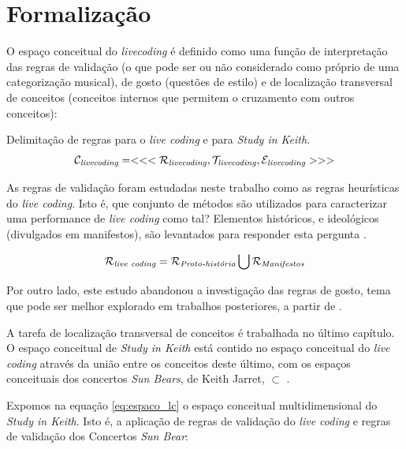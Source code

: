 \section{Formalização}\label{sec:formaliza}

O espaço conceitual do \emph{livecoding} é definido como uma função de interpretação das regras de validação (o que pode ser ou não considerado como próprio de uma categorização musical), de gosto (questões de estilo) e de localização transversal de conceitos (conceitos internos que permitem o cruzamento com outros conceitos):

\begin{example}{Delimitação de regras para o \emph{live coding} e para \emph{Study in Keith}.}
\begin{equation}
\mathcal{C}_\emph{livecoding} = <<<\mathcal{R}_\emph{livecoding}, \mathcal{T}_\emph{livecoding},  \mathcal{E}_\emph{livecoding} >>> 
\end{equation}

As regras de validação foram estudadas neste trabalho como as regras heurísticas do \emph{live coding}. Isto é, que conjunto de métodos são utilizados para caracterizar uma performance de \emph{live coding} como tal? Elementos históricos, e ideológicos (divulgados em manifestos), são levantados para responder esta pergunta .

\begin{equation}
\mathcal{R}_\emph{live coding} = \mathcal{R}_\emph{Proto-história} \bigcup  \mathcal{R}_\emph{Manifestos}
\end{equation}

Por outro lado, este estudo abandonou a investigação das regras de gosto, tema que pode ser melhor explorado em trabalhos posteriores, a partir de .

A tarefa de localização transversal de conceitos é trabalhada no último capítulo. O espaço conceitual de \emph{Study in Keith} está contido no espaço conceitual do \emph{live coding} através da união entre os conceitos deste último, com os espaços conceituais dos concertos \emph{Sun Bears}, de Keith Jarret,  $\subset$ . 

\end{example}

Expomos na equação \ref{eq:espaco_lc} o espaço conceitual multidimensional do \emph{Study in Keith}. Isto é, a aplicação de regras de validação do \emph{live coding} e regras de validação dos Concertos \emph{Sun Bear}:

